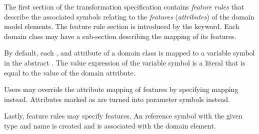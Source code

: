 The first section of the transformation specification contains \emph{feature rules} that describe the associated symbols relating to the \emph{features} (\emph{attributes}) of the domain model elements. The feature rule section is introduced by the  keyword. Each domain class may have a sub-section describing the mapping of its features.

By default, each ,  and  attribute of a domain class is mapped to a  variable symbol in the abstract . The value expression of the variable symbol is a literal that is equal to the value of the domain attribute.

Users may override the attribute mapping of  features by specifying  mapping instead. Attributes marked as  are turned into parameter symbols instead.

Lastly, feature rules may specify  features. An  reference symbol with the given type and name is created and is associated with the domain element.

